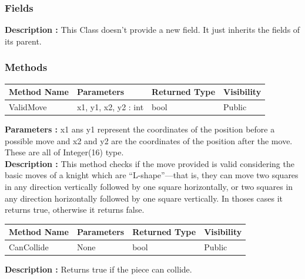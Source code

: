 \documentclass[12pt]{article}
\begin{document}
\subsubsection{Fields}

\textbf{Description :} This Class doesn't provide a new field. It just
inherits the fields of its parent.

\subsubsection{Methods}

\begin{table}[H]
    \begin{tabular}{|l|l|l|l|}
    \hline
    \rowcolor[HTML]{EFEFEF} 
    \cellcolor[HTML]{EFEFEF}\textbf{Method Name} & \textbf{Parameters}  & \textbf{Returned Type} & \textbf{Visibility} \\ \hline
    ValidMove                          & x1, y1, x2, y2 : int & bool                   & Public              \\ \hline
    \end{tabular}
\end{table}

\textbf{Parameters :} x1 ans y1 represent the coordinates of the position before a possible move
and x2 and y2 are the coordinates of the position after the move. These are all of Integer(16) type.
\\
\textbf{Description :} This method checks if the move provided is valid considering the basic moves of a knight which
are “L-shape”—that is, they can move two squares in any direction
vertically followed by one square horizontally, or two squares in any
direction horizontally followed by one square vertically. In thoses 
cases it returns true, otherwise it returns false. 

\begin{table}[H]
    \begin{tabular}{|l|l|l|l|}
    \hline
    \rowcolor[HTML]{EFEFEF} 
    \cellcolor[HTML]{EFEFEF}\textbf{Method Name} & \textbf{Parameters}  & \textbf{Returned Type} & \textbf{Visibility} \\ \hline
    CanCollide                                   & None                 & bool                   & Public              \\ \hline
    \end{tabular}
\end{table}

\textbf{Description :} Returns true if the piece can collide.
\end{document}
